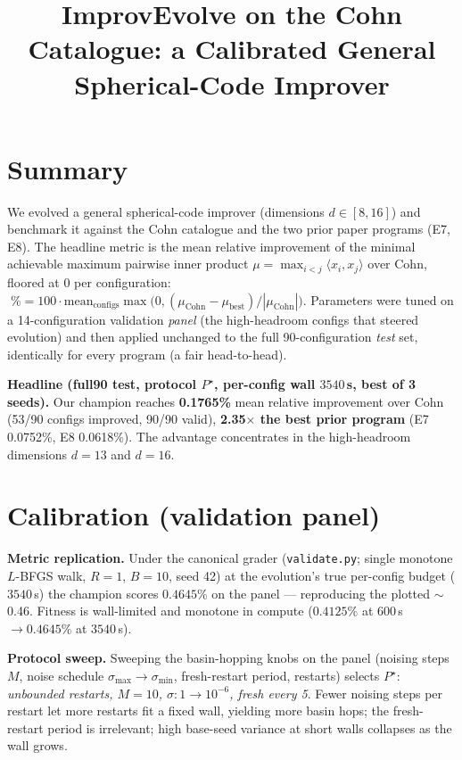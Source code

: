 \documentclass[10pt]{article}
\title{\vspace{-2.5em}ImprovEvolve on the Cohn Catalogue: a Calibrated General Spherical-Code Improver}
\author{}\date{}
\begin{document}
\maketitle\vspace{-3em}

\section*{Summary}
We evolved a general spherical-code improver (dimensions $d\in[8,16]$) and benchmark it
against the Cohn catalogue and the two prior paper programs (E7, E8). The headline metric is
the mean relative improvement of the minimal achievable maximum pairwise inner product
$\mu=\max_{i<j}\langle x_i,x_j\rangle$ over Cohn, floored at $0$ per configuration:
$\;\%=100\cdot\mathrm{mean}_{\text{configs}}\max\!\big(0,(\mu_{\mathrm{Cohn}}-\mu_{\text{best}})/|\mu_{\mathrm{Cohn}}|\big).$
Parameters were tuned on a 14-configuration validation \emph{panel} (the high-headroom
configs that steered evolution) and then applied unchanged to the full 90-configuration
\emph{test} set, identically for every program (a fair head-to-head).

\textbf{Headline (full90 test, protocol $P^\star$, per-config wall $3540$\,s, best of 3 seeds).}
Our champion reaches \textbf{0.1765\%} mean relative improvement over
Cohn (53/90 configs improved, 90/90 valid),
\textbf{2.35$\times$ the best prior program} (E7 0.0752\%, E8 0.0618\%).
The advantage concentrates in the high-headroom dimensions $d=13$ and $d=16$.

\section*{Calibration (validation panel)}
\textbf{Metric replication.} Under the canonical grader (\texttt{validate.py}; single monotone
$L$-BFGS walk, $R{=}1$, $B{=}10$, seed 42) at the evolution's true per-config budget
($3540$\,s) the champion scores $0.4645\%$ on the panel --- reproducing the plotted $\sim$0.46.
Fitness is wall-limited and monotone in compute ($0.4125\%$ at $600$\,s $\to 0.4645\%$ at $3540$\,s).

\textbf{Protocol sweep.} Sweeping the basin-hopping knobs on the panel
(noising steps $M$, noise schedule $\sigma_{\max}{\to}\sigma_{\min}$, fresh-restart period,
restarts) selects $P^\star$: \emph{unbounded restarts, $M{=}10$, $\sigma\!:\!1{\to}10^{-6}$,
fresh every 5}. Fewer noising steps per restart let more restarts fit a fixed wall, yielding
more basin hops; the fresh-restart period is irrelevant; high base-seed variance at short walls
collapses as the wall grows.
\end{document}
